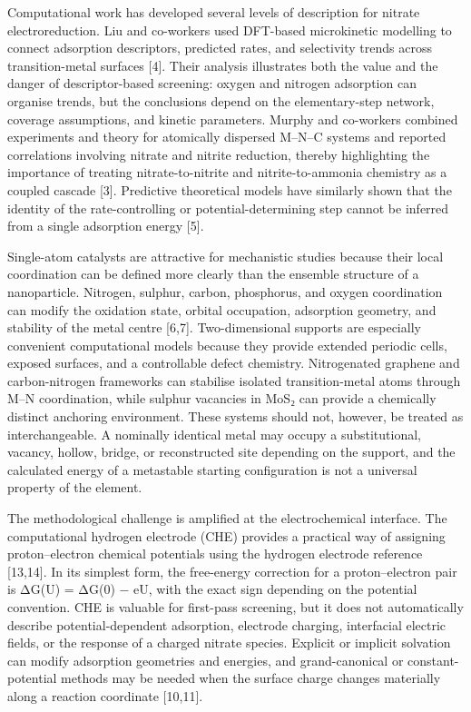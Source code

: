 \documentclass[
]{article}
\begin{document}
Computational work has developed several levels of description for
nitrate electroreduction. Liu and co-workers used DFT-based microkinetic
modelling to connect adsorption descriptors, predicted rates, and
selectivity trends across transition-metal surfaces {[}4{]}. Their
analysis illustrates both the value and the danger of descriptor-based
screening: oxygen and nitrogen adsorption can organise trends, but the
conclusions depend on the elementary-step network, coverage assumptions,
and kinetic parameters. Murphy and co-workers combined experiments and
theory for atomically dispersed M--N--C systems and reported
correlations involving nitrate and nitrite reduction, thereby
highlighting the importance of treating nitrate-to-nitrite and
nitrite-to-ammonia chemistry as a coupled cascade {[}3{]}. Predictive
theoretical models have similarly shown that the identity of the
rate-controlling or potential-determining step cannot be inferred from a
single adsorption energy {[}5{]}.

Single-atom catalysts are attractive for mechanistic studies because
their local coordination can be defined more clearly than the ensemble
structure of a nanoparticle. Nitrogen, sulphur, carbon, phosphorus, and
oxygen coordination can modify the oxidation state, orbital occupation,
adsorption geometry, and stability of the metal centre {[}6,7{]}.
Two-dimensional supports are especially convenient computational models
because they provide extended periodic cells, exposed surfaces, and a
controllable defect chemistry. Nitrogenated graphene and carbon-nitrogen
frameworks can stabilise isolated transition-metal atoms through M--N
coordination, while sulphur vacancies in MoS₂ can provide a chemically
distinct anchoring environment. These systems should not, however, be
treated as interchangeable. A nominally identical metal may occupy a
substitutional, vacancy, hollow, bridge, or reconstructed site depending
on the support, and the calculated energy of a metastable starting
configuration is not a universal property of the element.

The methodological challenge is amplified at the electrochemical
interface. The computational hydrogen electrode (CHE) provides a
practical way of assigning proton--electron chemical potentials using
the hydrogen electrode reference {[}13,14{]}. In its simplest form, the
free-energy correction for a proton--electron pair is ΔG(U) = ΔG(0) −
eU, with the exact sign depending on the potential convention. CHE is
valuable for first-pass screening, but it does not automatically
describe potential-dependent adsorption, electrode charging, interfacial
electric fields, or the response of a charged nitrate species. Explicit
or implicit solvation can modify adsorption geometries and energies, and
grand-canonical or constant-potential methods may be needed when the
surface charge changes materially along a reaction coordinate
{[}10,11{]}.
\end{document}
